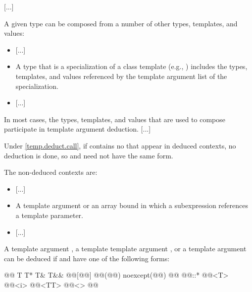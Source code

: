 \documentclass{wg21}
\begin{document}
\textcolor{noteclr}{[...]}

\pnum
A given type
can be composed from a number of other
types, templates, and  values:

\begin{itemize}
    \item
    \textcolor{noteclr}{[...]}
    \item
    A type that is a specialization of a class template (e.g.,
    )
    includes the types, templates, and  values referenced by the
    template argument list of the specialization.
    \item
    \textcolor{noteclr}{[...]}
\end{itemize}

\pnum
In most cases, the types, templates, and  values that are used
to compose
participate in template argument deduction.
\textcolor{noteclr}{[...]}
\begin{note}
Under \ref{temp.deduct.call},
if  contains no  that appear
in deduced contexts, no deduction is done, so  and 
need not have the same form.
\end{note}

\pnum
The non-deduced contexts are:

%
\begin{itemize}
    \item
    \textcolor{noteclr}{[...]}
    \item
    A  template argument or an array bound in which a subexpression
    references a template parameter.
    \item \textcolor{noteclr}{[...]}
\end{itemize}


\pnum
A  template  argument
,
a template template argument
 ,
or a  template  argument
can be deduced if
and
have one of the following forms:
\begin{codeblock}
    @\opt{\cv{}}@ T
    T*
    T&
    T&&
    @@[@@]
    @@(@@) noexcept(@@)
    @@ @@::*
    @@<T>
    @@<i>
    @@<TT>
    @@<>
    @@
\end{codeblock}
\end{document}
